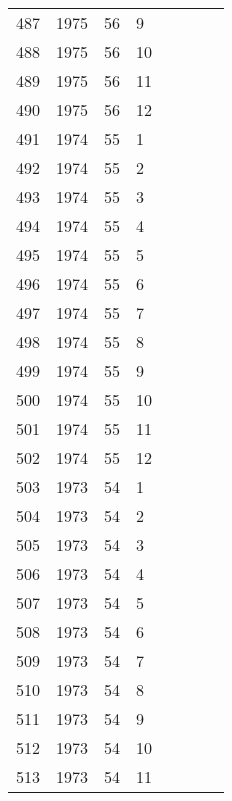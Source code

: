 \begin{longtable}{ |l|l|l|l|l|l|l|l| }
487 & 1975 & 56 &     9 &         &                &  & \\
488 & 1975 & 56 &    10 &         &                &  & \\
489 & 1975 & 56 &    11 &         &                &  & \\
490 & 1975 & 56 &    12 &         &                &  & \\
491 & 1974 & 55 &     1 &         &                &  & \\
492 & 1974 & 55 &     2 &         &                &  & \\
493 & 1974 & 55 &     3 &         &                &  & \\
494 & 1974 & 55 &     4 &         &                &  & \\
495 & 1974 & 55 &     5 &         &                &  & \\
496 & 1974 & 55 &     6 &         &                &  & \\
497 & 1974 & 55 &     7 &         &                &  & \\
498 & 1974 & 55 &     8 &         &                &  & \\
499 & 1974 & 55 &     9 &         &                &  & \\
500 & 1974 & 55 &    10 &         &                &  & \\
501 & 1974 & 55 &    11 &         &                &  & \\
502 & 1974 & 55 &    12 &         &                &  & \\
503 & 1973 & 54 &     1 &         &                &  & \\
504 & 1973 & 54 &     2 &         &                &  & \\
505 & 1973 & 54 &     3 &         &                &  & \\
506 & 1973 & 54 &     4 &         &                &  & \\
507 & 1973 & 54 &     5 &         &                &  & \\
508 & 1973 & 54 &     6 &         &                &  & \\
509 & 1973 & 54 &     7 &         &                &  & \\
510 & 1973 & 54 &     8 &         &                &  & \\
511 & 1973 & 54 &     9 &         &                &  & \\
512 & 1973 & 54 &    10 &         &                &  & \\
513 & 1973 & 54 &    11 &         &                &  & \\

\end{longtable}
